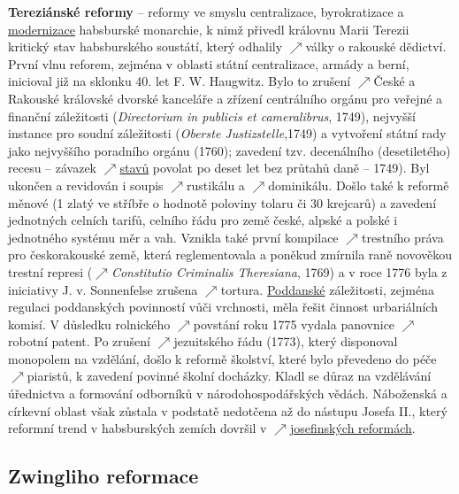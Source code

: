 \documentclass{article}
\begin{document}
  {\bf Tereziánské reformy} -- reformy ve smyslu centralizace, byrokratizace a \hyperref[sec:modernizace]{modernizace} habsburské monarchie, k nimž přivedl královnu Marii Terezii kritický stav habsburského soustátí, který odhalily $\nearrow$války o rakouské dědictví. První vlnu reforem, zejména v oblasti státní centralizace, armády a berní, inicioval již na sklonku 40. let F. W. Haugwitz. Bylo to zrušení $\nearrow$České a Rakouské královské dvorské kanceláře a zřízení centrálního orgánu pro veřejné a finanční záležitosti ({\it Directorium in publicis et cameralibrus}, 1749), nejvyšší instance pro soudní záležitosti ({\it Oberste Justizstelle},1749) a vytvoření státní rady jako nejvyššího poradního orgánu (1760); zavedení tzv. decenálního (desetiletého) recesu -- závazek $\nearrow$\hyperref[sec:stavy]{stavů} povolat po deset let bez průtahů daně -- 1749). Byl ukončen a revidován i soupis $\nearrow$rustikálu a $\nearrow$dominikálu. Došlo také k reformě měnové (1 zlatý ve stříbře o hodnotě poloviny tolaru či 30 krejcarů) a zavedení jednotných celních tarifů, celního řádu pro země české, alpské a polské i jednotného systému měr a vah. Vznikla také první kompilace $\nearrow$trestního práva pro českorakouské země, která reglementovala a poněkud zmírnila raně novověkou trestní represi ($\nearrow${\it Constitutio Criminalis Theresiana}, 1769) a v roce 1776 byla z iniciativy J. v. Sonnenfelse zrušena $\nearrow$tortura. \hyperref[sec:poddanstvi]{Poddanské} záležitosti, zejména regulaci poddanských povinností vůči vrchnosti, měla řešit činnost urbariálních komisí. V důsledku rolnického $\nearrow$povstání roku 1775 vydala panovnice $\nearrow$robotní patent. Po zrušení $\nearrow$jezuitského řádu (1773), který disponoval monopolem na vzdělání, došlo k reformě školství, které bylo převedeno do péče $\nearrow$piaristů, k zavedení povinné školní docházky. Kladl se důraz na vzdělávání úřednictva a formování odborníků v národohospodářských vědách. Náboženská a církevní oblast však zůstala v podstatě nedotčena až do nástupu Josefa II., který reformní trend v habsburských zemích dovršil v $\nearrow$\hyperref[sec:josefinskeReformy]{josefinských reformách}.

  \subsection*{Zwingliho reformace~\cite{Hroch:}}
  \label{sec:zwinglihoReformace}
\end{document}
